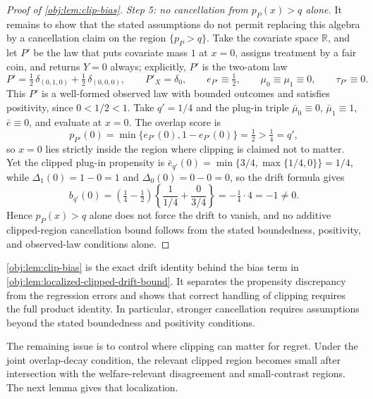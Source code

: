 \documentclass[11pt]{article}
\begin{document}
\begin{proof}[Proof of \cref{obj:lem:clip-bias}]
\emph{Step 5: no cancellation from \(p_P(x)>q\) alone.}  It remains to show that the stated assumptions do not permit replacing this algebra by a cancellation claim on the region \(\{p_P>q\}\).  Take the covariate space \(\mathbb R\), and let \(P'\) be the law that puts covariate mass \(1\) at \(x=0\), assigns treatment by a fair coin, and returns \(Y=0\) always; explicitly, \(P'\) is the two-atom law
\[
P'=\tfrac12\,\delta_{(0,1,0)}+\tfrac12\,\delta_{(0,0,0)},
\qquad
P'_X=\delta_0,
\qquad
e_{P'}\equiv\tfrac12,
\qquad
\mu_0\equiv\mu_1\equiv 0,
\qquad
\tau_{P'}\equiv 0 .
\]
This \(P'\) is a well-formed observed law with bounded outcomes and satisfies positivity, since \(0<1/2<1\). %
Take \(q'=1/4\) and the plug-in triple \(\bar\mu_0\equiv0\), \(\bar\mu_1\equiv1\), \(\bar e\equiv0\), and evaluate at \(x=0\).  The overlap score is
\[
p_{P'}(0)=\min\{e_{P'}(0),1-e_{P'}(0)\}=\tfrac12>\tfrac14=q',
\]
so \(x=0\) lies strictly inside the region where clipping is claimed not to matter. %
Yet the clipped plug-in propensity is \(\bar e_{q'}(0)=\min\{3/4,\max\{1/4,0\}\}=1/4\), while \(\Delta_1(0)=1-0=1\) and \(\Delta_0(0)=0-0=0\), so the drift formula gives
\[
b_{q'}(0)
=
\left(\tfrac14-\tfrac12\right)
\left\{\frac{1}{1/4}+\frac{0}{3/4}\right\}
=
-\tfrac14\cdot 4
=
-1
\ne 0 .
\]
Hence \(p_P(x)>q\) alone does not force the drift to vanish, and no additive clipped-region cancellation bound follows from the stated boundedness, positivity, and observed-law conditions alone. %
\end{proof}

\cref{obj:lem:clip-bias} is the exact drift identity behind the bias term in \cref{obj:lem:localized-clipped-drift-bound}.  It separates the propensity discrepancy from the regression errors and shows that correct handling of clipping requires the full product identity.  In particular, stronger cancellation requires assumptions beyond the stated boundedness and positivity conditions.

The remaining issue is to control where clipping can matter for regret.  Under the joint overlap-decay condition, the relevant clipped region becomes small after intersection with the welfare-relevant disagreement and small-contrast regions.  The next lemma gives that localization.
\end{document}
